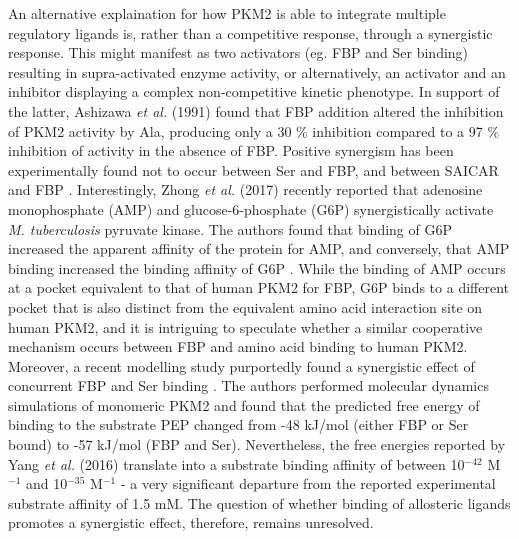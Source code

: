An alternative explaination for how PKM2 is able to integrate multiple regulatory ligands is, rather than a competitive response, through a synergistic response. This might manifest as two activators (eg. FBP and Ser binding) resulting in supra-activated enzyme activity, or alternatively, an activator and an inhibitor displaying a complex non-competitive kinetic phenotype. In support of the latter, Ashizawa \textit{et al.} (1991) \cite{Ashizawa:1991aa} found that FBP addition altered the inhibition of PKM2 activity by Ala, producing only a 30 \% inhibition compared to a 97 \% inhibition of activity in the absence of FBP. Positive synergism has been experimentally found not to occur between Ser and FBP, and between SAICAR and FBP \cite{Keller:2012aa,Chaneton:2012aa}. Interestingly, Zhong \textit{et al.} (2017) \cite{Zhong:2017aa} recently reported that adenosine monophosphate (AMP) and glucose-6-phosphate (G6P) synergistically activate \textit{M. tuberculosis} pyruvate kinase. The authors found that binding of G6P increased the apparent affinity of the protein for AMP, and conversely, that AMP binding increased the binding affinity of G6P \cite{Zhong:2017aa}. While the binding of AMP occurs at a pocket equivalent to that of human PKM2 for FBP, G6P binds to a different pocket that is also distinct from the equivalent amino acid interaction site on human PKM2, and it is intriguing to speculate whether a similar cooperative mechanism occurs between FBP and amino acid binding to human PKM2. Moreover, a recent modelling study purportedly found a synergistic effect of concurrent FBP and Ser binding \cite{Yang:2016aa}. The authors performed molecular dynamics simulations of monomeric PKM2 and found that the predicted free energy of binding to the substrate PEP changed from -48 kJ/mol (either FBP or Ser bound) to -57 kJ/mol (FBP and Ser). Nevertheless, the free energies reported by Yang \textit{et al.} (2016) \cite{Yang:2016aa} translate into a substrate binding affinity of between 10$^{-42}$ M$^{-1}$ and 10$^{-35}$ M$^{-1}$ - a very significant departure from the reported experimental substrate affinity of 1.5 mM. The question of whether binding of allosteric ligands promotes a synergistic effect, therefore, remains unresolved.
%
%
\\\\
%
%
